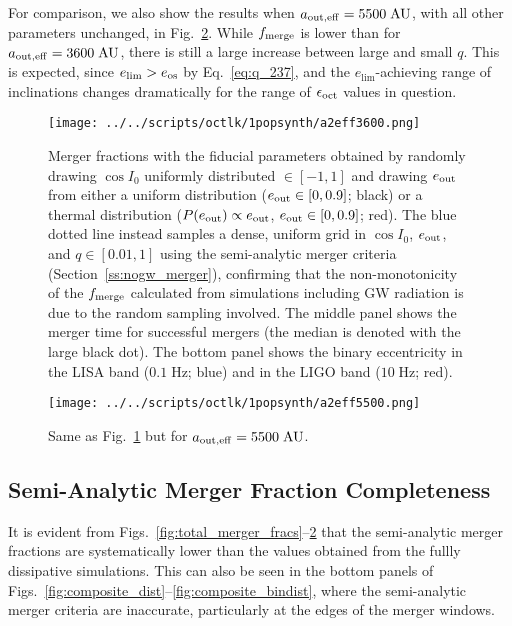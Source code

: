 \documentclass[
        fleqn,
        usenatbib,
    ]{mnras}
\begin{document}
For comparison, we also show the results when $a_{\rm out, eff} =
5500\;\mathrm{AU}$, with all other parameters unchanged, in
Fig.~\ref{fig:popsynth5500}. While $f_{\rm merge}$ is lower than for $a_{\rm
out, eff} = 3600\;\mathrm{AU}$, there is still a large increase between large
and small $q$. This is expected, since $e_{\lim} > e_{\rm os}$ by
Eq.~\eqref{eq:q_237}, and the $e_{\lim}$-achieving range of inclinations changes
dramatically for the range of $\epsilon_{\rm oct}$ values in question.
\begin{figure}
    \centering
    \texttt{[image: ../../scripts/octlk/1popsynth/a2eff3600.png]}
    \caption{Merger fractions with the fiducial parameters obtained by randomly
    drawing $\cos I_0$ uniformly distributed $\in [-1, 1]$ and drawing $e_{\rm
    out}$ from either a uniform distribution ($e_{\rm out} \in [0, 0.9]$; black)
    or a thermal distribution ($P(e_{\rm out}) \propto e_{\rm out}$, $e_{\rm
    out} \in [0, 0.9]$; red). The blue dotted line instead samples a dense,
    uniform grid in $\cos I_0$, $e_{\rm out}$, and $q \in [0.01, 1]$ using the
    semi-analytic merger criteria (Section~\ref{ss:nogw_merger}), confirming
    that the non-monotonicity of the $f_{\rm merge}$ calculated from simulations
    including GW radiation is due to the random sampling involved. The middle
    panel shows the merger time for successful mergers (the median is denoted
    with the large black dot). The bottom panel shows the binary eccentricity in
    the LISA band ($0.1\;\mathrm{Hz}$; blue) and in the LIGO band ($10
    \;\mathrm{Hz}$; red).
    }\label{fig:popsynth}
\end{figure}
\begin{figure}
    \centering
    \texttt{[image: ../../scripts/octlk/1popsynth/a2eff5500.png]}
    \caption{Same as Fig.~\ref{fig:popsynth} but for $a_{\rm out, eff} =
    5500\;\mathrm{AU}$. }\label{fig:popsynth5500}
\end{figure}

\subsection{Semi-Analytic Merger Fraction Completeness}\label{ss:completeness}

It is evident from Figs.~\ref{fig:total_merger_fracs}--\ref{fig:popsynth5500}
that the semi-analytic merger fractions are systematically lower than the values
obtained from the fullly dissipative simulations. This can also be seen in the
bottom panels of Figs.~\ref{fig:composite_dist}--\ref{fig:composite_bindist},
where the semi-analytic merger criteria are inaccurate, particularly at the
edges of the merger windows.
\end{document}
